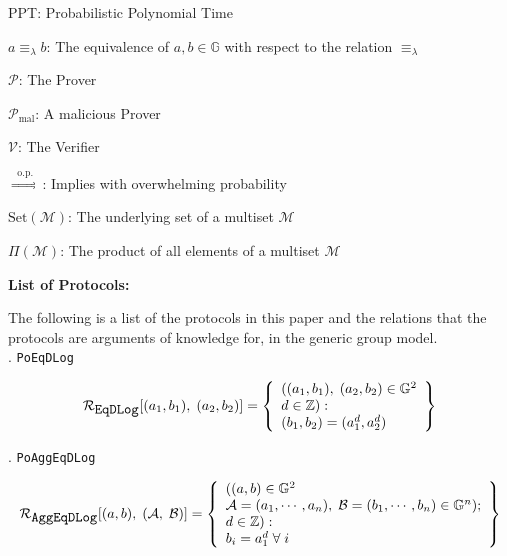 \documentclass[11pt, lettersize, notitlepage, leqno, footskip=0.6cm]{article}
\newcommand{\sett}{\mr{Set}}
\newcommand{\impop}{\overset{\;\;\mr{o.p.}\;\;}{\Longrightarrow}}
\newcommand{\eqlam}{\equiv_{\lam}}
\newcommand{\mc}{\mathcal}
\newcommand{\mb}{\mathbb}
\newcommand{\mr}{\mathrm}
\newcommand{\lam}{\lambda}
\newcommand{\noin}{\noindent}
\numberwithin{equation}{section}
\begin{document}
{\noin PPT: Probabilistic Polynomial Time \vspace{0.1cm}

\noindent $a\eqlam b$: The equivalence of $a,b\in\mb{G}$ with respect to the relation $\eqlam$ \vspace{0.1cm}

\noin $\mc{P}$: The Prover \vspace{0.1cm}

\noin $\mc{P}_{\mr{mal}}$: A malicious Prover \vspace{0.1cm}

\noin $\mc{V}$: The Verifier \vspace{0.1cm}

\noin $\impop$: Implies with overwhelming probability \vspace{0.1cm}

\noin $\sett(\mc{M})$: The underlying set of a multiset $\mc{M}$ \vspace{0.1cm}

\noin $\Pi(\mc{M})$: The product of all elements of a multiset $\mc{M}$

\bigskip \begin{center} \textbf{List of Protocols:}

\end{center}

The following is a list of the protocols in this paper and the relations that the protocols are arguments of knowledge for, in the generic group model.\\

\noin 1. \verb|PoEqDLog| \vspace{-0.3cm}

\[
  \mc{R}_{{\protect\verb|EqDLog|}}[(a_1, b_1),\;(a_2,b_2)] = \left\{\begin{array}{l}
    ((a_1, b_1), \; (a_2,b_2)\in\mb{G}^2\\
    d\in\mb{Z}): \\
    (b_1,b_2) = (a_1^d,a_2^d)
  \end{array}\right\}
\]

\noin 2. \verb|PoAggEqDLog| \vspace{-0.3cm}

\[
  \mc{R}_{{\protect\verb|AggEqDLog|}}[(a, b),\;(\mc{A},\;\mc{B})] = \left\{\begin{array}{l}
  	((a, b)\in\mb{G}^2\\
    \mc{A} = (a_1, \cdots, a_n),\;\mc{B} = (b_1,\cdots, b_n)\in\mb{G}^n);\\
    d\in\mb{Z}): \\
    b_i = a_1^{d} \;\forall\;i
  \end{array}\right\}
\]
 

}
\end{document}
